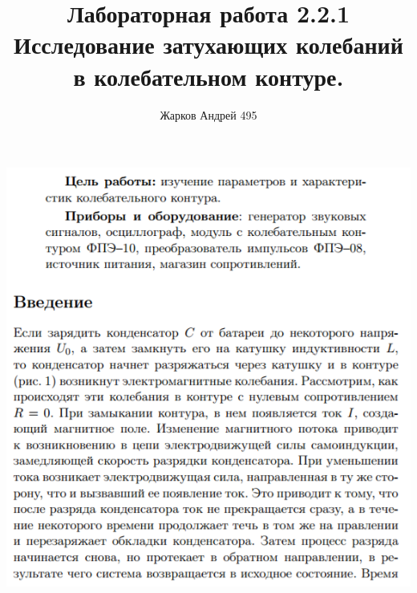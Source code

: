 \documentclass[12pt]{article}
\begin{document}
	\author {Жарков Андрей 495}
	\title {Лабораторная работа 2.2.1 \\  Исследование затухающих колебаний в колебательном контуре.}
    \maketitle{}
	    
    \begin{center}
       	\includegraphics[width=15cm]{theory1.png}

\end{center}
\end{document}
